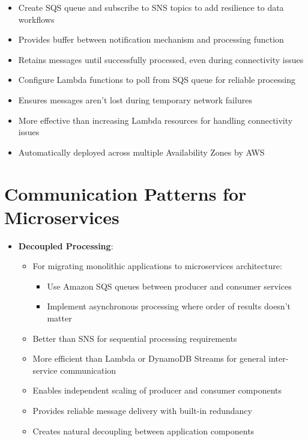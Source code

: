 \documentclass[11pt,a4paper]{report}
\begin{document}
\begin{itemize}
\begin{itemize}
  \item Create SQS queue and subscribe to SNS topics to add resilience to data workflows
  \item Provides buffer between notification mechanism and processing function
  \item Retains messages until successfully processed, even during connectivity issues
  \item Configure Lambda functions to poll from SQS queue for reliable processing
  \item Ensures messages aren't lost during temporary network failures
  \item More effective than increasing Lambda resources for handling connectivity issues
  \item Automatically deployed across multiple Availability Zones by AWS
\end{itemize}
\end{itemize}


\section{Communication Patterns for Microservices}

\begin{itemize}
  \item \textbf{Decoupled Processing}:
\begin{itemize}
  \item For migrating monolithic applications to microservices architecture:
\begin{itemize}
  \item Use Amazon SQS queues between producer and consumer services
  \item Implement asynchronous processing where order of results doesn't matter
\end{itemize}
  \item Better than SNS for sequential processing requirements
  \item More efficient than Lambda or DynamoDB Streams for general inter-service communication
  \item Enables independent scaling of producer and consumer components
  \item Provides reliable message delivery with built-in redundancy
  \item Creates natural decoupling between application components
\end{itemize}
\end{itemize}
\end{document}
